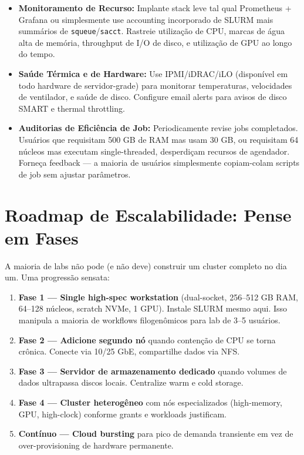\begin{itemize}
\item \textbf{Monitoramento de Recurso:} Implante stack leve tal qual Prometheus + Grafana ou simplesmente use accounting incorporado de SLURM mais summários de \texttt{squeue}/\texttt{sacct}. Rastreie utilização de CPU, marcas de água alta de memória, throughput de I/O de disco, e utilização de GPU ao longo do tempo.

\item \textbf{Saúde Térmica e de Hardware:} Use IPMI/iDRAC/iLO (disponível em todo hardware de servidor-grade) para monitorar temperaturas, velocidades de ventilador, e saúde de disco. Configure email alerts para avisos de disco SMART e thermal throttling.

\item \textbf{Auditorias de Eficiência de Job:} Periodicamente revise jobs completados. Usuários que requisitam 500 GB de RAM mas usam 30 GB, ou requisitam 64 núcleos mas executam single-threaded, desperdiçam recursos de agendador. Forneça feedback --- a maioria de usuários simplesmente copiam-colam scripts de job sem ajustar parâmetros.
\end{itemize}

\section{Roadmap de Escalabilidade: Pense em Fases}

A maioria de labs não pode (e não deve) construir um cluster completo no dia um. Uma progressão sensata:

\begin{enumerate}
\item \textbf{Fase 1 --- Single high-spec workstation} (dual-socket, 256--512 GB RAM, 64--128 núcleos, scratch NVMe, 1 GPU). Instale SLURM mesmo aqui. Isso manipula a maioria de workflows filogenômicos para lab de 3--5 usuários.

\item \textbf{Fase 2 --- Adicione segundo nó} quando contenção de CPU se torna crônica. Conecte via 10/25 GbE, compartilhe dados via NFS.

\item \textbf{Fase 3 --- Servidor de armazenamento dedicado} quando volumes de dados ultrapassa discos locais. Centralize warm e cold storage.

\item \textbf{Fase 4 --- Cluster heterogêneo} com nós especializados (high-memory, GPU, high-clock) conforme grants e workloads justificam.

\item \textbf{Contínuo --- Cloud bursting} para pico de demanda transiente em vez de over-provisioning de hardware permanente.
\end{enumerate}

